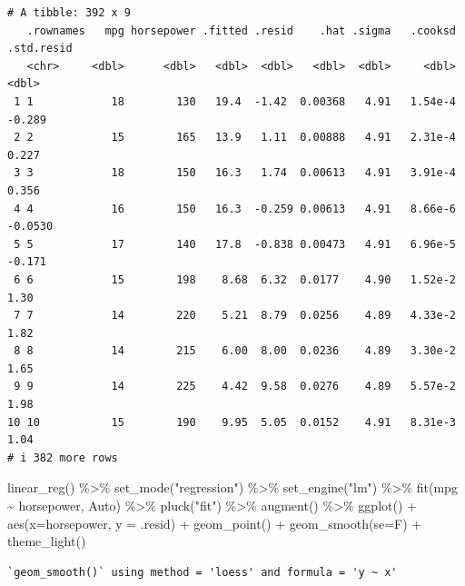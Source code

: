 \documentclass[
  letterpaper,
  DIV=11,
  numbers=noendperiod]{scrreprt}
\newenvironment{Shaded}{\begin{snugshade}}{\end{snugshade}}
\newcommand{\AttributeTok}[1]{\textcolor[rgb]{0.65,0.35,0.00}{#1}}
\newcommand{\FunctionTok}[1]{\textcolor[rgb]{0.02,0.16,0.49}{#1}}
\newcommand{\NormalTok}[1]{\textcolor[rgb]{0.33,0.33,0.33}{#1}}
\newcommand{\SpecialCharTok}[1]{\textcolor[rgb]{0.00,0.46,0.62}{#1}}
\newcommand{\StringTok}[1]{\textcolor[rgb]{0.00,0.50,0.00}{#1}}
\begin{document}
\begin{verbatim}
# A tibble: 392 x 9
   .rownames   mpg horsepower .fitted .resid    .hat .sigma   .cooksd .std.resid
   <chr>     <dbl>      <dbl>   <dbl>  <dbl>   <dbl>  <dbl>     <dbl>      <dbl>
 1 1            18        130   19.4  -1.42  0.00368   4.91   1.54e-4    -0.289 
 2 2            15        165   13.9   1.11  0.00888   4.91   2.31e-4     0.227 
 3 3            18        150   16.3   1.74  0.00613   4.91   3.91e-4     0.356 
 4 4            16        150   16.3  -0.259 0.00613   4.91   8.66e-6    -0.0530
 5 5            17        140   17.8  -0.838 0.00473   4.91   6.96e-5    -0.171 
 6 6            15        198    8.68  6.32  0.0177    4.90   1.52e-2     1.30  
 7 7            14        220    5.21  8.79  0.0256    4.89   4.33e-2     1.82  
 8 8            14        215    6.00  8.00  0.0236    4.89   3.30e-2     1.65  
 9 9            14        225    4.42  9.58  0.0276    4.89   5.57e-2     1.98  
10 10           15        190    9.95  5.05  0.0152    4.91   8.31e-3     1.04  
# i 382 more rows
\end{verbatim}

\begin{Shaded}
\begin{Highlighting}[]
\FunctionTok{linear\_reg}\NormalTok{() }\SpecialCharTok{\%\textgreater{}\%} 
  \FunctionTok{set\_mode}\NormalTok{(}\StringTok{"regression"}\NormalTok{) }\SpecialCharTok{\%\textgreater{}\%} 
  \FunctionTok{set\_engine}\NormalTok{(}\StringTok{"lm"}\NormalTok{) }\SpecialCharTok{\%\textgreater{}\%} 
  \FunctionTok{fit}\NormalTok{(mpg }\SpecialCharTok{\textasciitilde{}}\NormalTok{ horsepower, Auto) }\SpecialCharTok{\%\textgreater{}\%} 
  \FunctionTok{pluck}\NormalTok{(}\StringTok{"fit"}\NormalTok{) }\SpecialCharTok{\%\textgreater{}\%} 
  \FunctionTok{augment}\NormalTok{() }\SpecialCharTok{\%\textgreater{}\%} 
  \FunctionTok{ggplot}\NormalTok{() }\SpecialCharTok{+} \FunctionTok{aes}\NormalTok{(}\AttributeTok{x=}\NormalTok{horsepower, }\AttributeTok{y =}\NormalTok{ .resid) }\SpecialCharTok{+} \FunctionTok{geom\_point}\NormalTok{() }\SpecialCharTok{+} \FunctionTok{geom\_smooth}\NormalTok{(}\AttributeTok{se=}\NormalTok{F) }\SpecialCharTok{+} \FunctionTok{theme\_light}\NormalTok{()}
\end{Highlighting}
\end{Shaded}

\begin{verbatim}
`geom_smooth()` using method = 'loess' and formula = 'y ~ x'
\end{verbatim}
\end{document}

